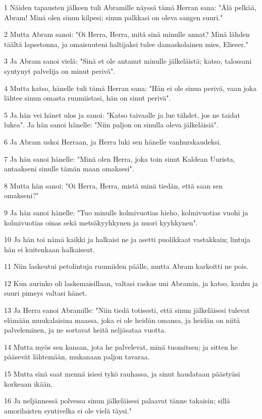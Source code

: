 \par 1 Näiden tapausten jälkeen tuli Abramille näyssä tämä Herran sana: "Älä pelkää, Abram! Minä olen sinun kilpesi; sinun palkkasi on oleva sangen suuri."
\par 2 Mutta Abram sanoi: "Oi Herra, Herra, mitä sinä minulle annat? Minä lähden täältä lapsetonna, ja omaisuuteni haltijaksi tulee damaskolainen mies, Elieser."
\par 3 Ja Abram sanoi vielä: "Sinä et ole antanut minulle jälkeläistä; katso, talossani syntynyt palvelija on minut perivä".
\par 4 Mutta katso, hänelle tuli tämä Herran sana: "Hän ei ole sinua perivä, vaan joka lähtee sinun omasta ruumiistasi, hän on sinut perivä".
\par 5 Ja hän vei hänet ulos ja sanoi: "Katso taivaalle ja lue tähdet, jos ne taidat lukea". Ja hän sanoi hänelle: "Niin paljon on sinulla oleva jälkeläisiä".
\par 6 Ja Abram uskoi Herraan, ja Herra luki sen hänelle vanhurskaudeksi.
\par 7 Ja hän sanoi hänelle: "Minä olen Herra, joka toin sinut Kaldean Uurista, antaakseni sinulle tämän maan omaksesi".
\par 8 Mutta hän sanoi: "Oi Herra, Herra, mistä minä tiedän, että saan sen omakseni?"
\par 9 Ja hän sanoi hänelle: "Tuo minulle kolmivuotias hieho, kolmivuotias vuohi ja kolmivuotias oinas sekä metsäkyyhkynen ja nuori kyyhkynen".
\par 10 Ja hän toi nämä kaikki ja halkaisi ne ja asetti puolikkaat vastakkain; lintuja hän ei kuitenkaan halkaissut.
\par 11 Niin laskeutui petolintuja ruumiiden päälle, mutta Abram karkoitti ne pois.
\par 12 Kun aurinko oli laskemaisillaan, valtasi raskas uni Abramin, ja katso, kauhu ja suuri pimeys valtasi hänet.
\par 13 Ja Herra sanoi Abramille: "Niin tiedä totisesti, että sinun jälkeläisesi tulevat elämään muukalaisina maassa, joka ei ole heidän omansa, ja heidän on niitä palveleminen, ja ne sortavat heitä neljäsataa vuotta.
\par 14 Mutta myös sen kansan, jota he palvelevat, minä tuomitsen; ja sitten he pääsevät lähtemään, mukanaan paljon tavaraa.
\par 15 Mutta sinä saat mennä isiesi tykö rauhassa, ja sinut haudataan päästyäsi korkeaan ikään.
\par 16 Ja neljännessä polvessa sinun jälkeläisesi palaavat tänne takaisin; sillä amorilaisten syntivelka ei ole vielä täysi."
